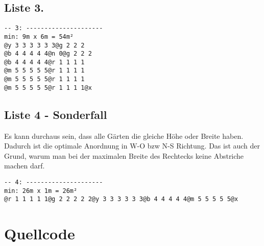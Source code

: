 \documentclass[a4paper,10pt,ngerman]{scrartcl}
\begin{document}
\subsection{Liste 3.}
\begin{lstlisting}
-- 3: ---------------------
min: 9m x 6m = 54m²
@y 3 3 3 3 3 3@g 2 2 2
@b 4 4 4 4 4@n 0@g 2 2 2
@b 4 4 4 4 4@r 1 1 1 1
@m 5 5 5 5 5@r 1 1 1 1
@m 5 5 5 5 5@r 1 1 1 1
@m 5 5 5 5 5@r 1 1 1 1@x
\end{lstlisting}

\subsection{Liste 4 - Sonderfall}
Es kann durchaus sein, dass alle Gärten die gleiche Höhe oder Breite haben. Dadurch ist die optimale Anordnung in W-O bzw N-S Richtung. Das ist auch der Grund, warum man bei der maximalen Breite des Rechtecks keine Abstriche machen darf.
\begin{lstlisting}
-- 4: ---------------------
min: 26m x 1m = 26m²
@r 1 1 1 1 1@g 2 2 2 2 2@y 3 3 3 3 3 3@b 4 4 4 4 4@m 5 5 5 5 5@x
\end{lstlisting}


\section{Quellcode}
\end{document}
